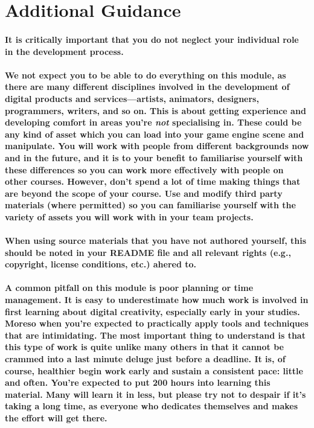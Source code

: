 \documentclass{../../fal_assignment}
\begin{document}
\newpage
\section*{Additional Guidance}

\paragraph{It is critically important that you do not neglect your individual role in the development process.}

\paragraph{We not expect you to be able to do everything on this module, as there are many different disciplines involved in the development of digital products and services---artists, animators, designers, programmers, writers, and so on. This is about getting experience and developing comfort in areas you're \textit{not} specialising in. These could be any kind of asset which you can load into your game engine scene and manipulate. You will work with people from different backgrounds now and in the future, and it is to your benefit to familiarise yourself with these differences so you can work more effectively with people on other courses. However, don't spend a lot of time making things that are beyond the scope of your course. Use and modify third party materials (where permitted) so you can familiarise yourself with the variety of assets you will work with in your team projects.}

\paragraph{When using source materials that you have not authored yourself, this should be noted in your README file and all relevant rights (e.g., copyright, license conditions, etc.) ahered to.}

\paragraph{A common pitfall on this module is poor planning or time management. It is easy to underestimate how much work is involved in first learning about digital creativity, especially early in your studies. Moreso when you're expected to practically apply tools and techniques that are intimidating. The most important thing to understand is that this type of work is quite unlike many others in that it cannot be crammed into a last minute deluge just before a deadline. It is, of course, healthier begin work early and sustain a consistent pace: little and often. You're expected to put 200 hours into learning this material. Many will learn it in less, but please try not to despair if it's taking a long time, as everyone who dedicates themselves and makes the effort will get there.}
\end{document}
